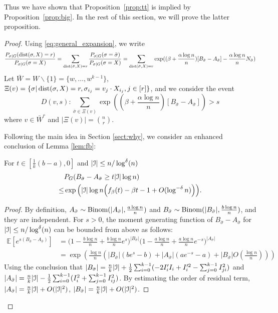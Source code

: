\documentclass{article}
\begin{document}
Thus we have shown that Proposition~\ref{prop:tt} is implied by Proposition~\ref{prop:big}. In the rest of this section, we will prove the latter proposition.
\begin{proof}
Using \eqref{eq:general_expansion}, we write
$$
\frac{P_{\sigma|G}(\operatorname{dist}(\sigma, X)=r)}
{P_{\sigma|G}(\sigma=X)} = \sum_{\operatorname{dist}(\bar{\sigma}, X)=r} 
\frac{P_{\sigma|G}(\sigma=\bar{\sigma})}
{P_{\sigma|G}(\sigma=X)}=
\sum_{\operatorname{dist}(\bar{\sigma}, X)=r} \exp((\beta + \frac{\alpha \log n}{n})[B_{\bar{\sigma}} - A_{\bar{\sigma}}] - \frac{\alpha \log n}{n} N_{\bar{\sigma}})
$$
Let $\bar{W} = W\backslash\{1\} = \{w, \dots, w^{k-1}\}$, $\Xi(v) = \{ \sigma | \operatorname{dist}(\sigma, X) = r,  \sigma_{i_j} = v_j \cdot X_{i_j}, j \in [r] \}$,
and we consider the event
$$
D(v, s): \sum_{\bar{\sigma} \in \Xi(v)} \exp((\beta + \frac{\alpha \log n}{n}) [B_{\bar{\sigma}} - A_{\bar{\sigma}}]) > s
$$
where $v \in \bar{W}^r$ and $|\Xi(v)|=\binom{n}{r}$.

Following the main idea in Section \ref{sect:why}, we consider an enhanced conclusion of Lemma \ref{lem:fb}:
\begin{lemma}\label{lem:enhanced_fb}
	For $t\in [\frac{1}{k}(b-a), 0]$
	and $ |\mathcal{I}| \le n/\log^{\delta}(n)$
	\begin{equation} \label{eq:upmpt}
	\begin{aligned}
	& P_G(B_{\bar{\sigma}}-A_{\bar{\sigma}}\ge t |\mathcal{I}| \log n)  \\
	\le & \exp\Big(|\mathcal{I}| \log n
	\Big(f_{\beta}(t) - \beta t -1	+ O(\log^{-\delta} n) \Big)\Big) .
	\end{aligned}
	\end{equation}
\end{lemma}
\begin{proof}
	By definition, $A_{\bar{\sigma}}\sim\operatorname{Binom}(|A_{\bar{\sigma}}|,\frac{a\log n}{n})$ and
	$B_{\bar{\sigma}}\sim\operatorname{Binom}(|B_{\bar{\sigma}}|,\frac{b\log n}{n})$, and they are independent. For $s>0$, the moment generating function of $B_{\bar{\sigma}}-A_{\bar{\sigma}}$ for $ |\mathcal{I}| \le n/\log^{\delta}(n)$ can be bounded from above as follows:
	\begin{align*}
	 \mathbb{E}[e^{s(B_{\bar{\sigma}}-A_{\bar{\sigma}})}] 
	& =\Big(1-\frac{b\log n}{n}+\frac{b\log n}{n} e^s \Big)^{|B_{\bar{\sigma}}|}
	\Big(1-\frac{a\log n}{n}+\frac{a\log n}{n} e^{-s} \Big)^{|A_{\bar{\sigma}}|}  \\
	& = \exp(\frac{\log n}{n}\left(|B_{\bar{\sigma}}|(be^s - b) + |A_{\bar{\sigma}}|(ae^{-s}-a) + |B_{\bar{\sigma}}|O(\frac{\log n}{n}) \right))
	\end{align*}
	Using the conclusion that $|B_{\bar{\sigma}}|=\frac{n}{k}|\mathcal{I}| + \frac{1}{2}\sum_{i=0}^{k-1}  (-2 I'_i I_i  + I'^2_i - \sum_{j=0}^{k-1} I^2_{ji})$ and
	$|A_{\bar{\sigma}}| = \frac{n}{k}|\mathcal{I}| - \frac{1}{2}\sum_{i=0}^{k-1}  (I^2_i + \sum_{j=0}^{k-1} I^2_{ij})$.
	By estimating the order of residual term, $|A_{\bar{\sigma}}| = \frac{n}{k}|\mathcal{I}| + O(|\mathcal{I}|^2)$,
	 $|B_{\bar{\sigma}}| = \frac{n}{k}|\mathcal{I}| + O(|\mathcal{I}|^2)$.
	 

\end{proof}
\end{proof}
\end{document}
